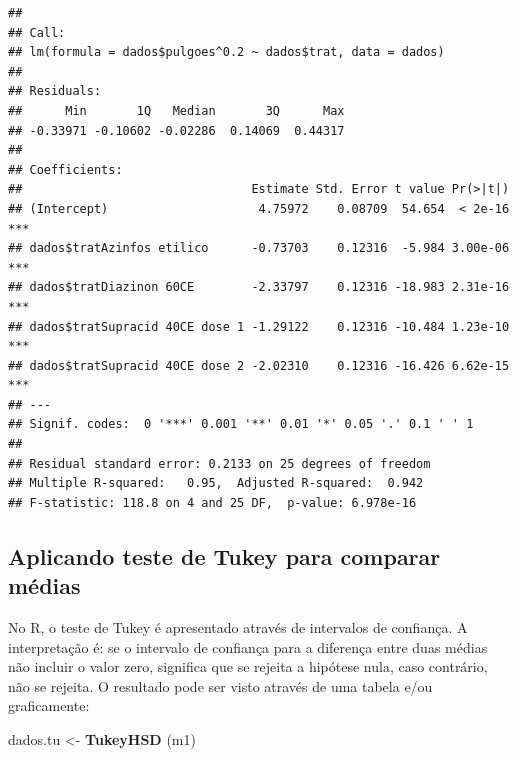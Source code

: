 \documentclass[
]{book}
\newenvironment{Shaded}{\begin{snugshade}}{\end{snugshade}}
\newcommand{\DataTypeTok}[1]{\textcolor[rgb]{0.13,0.29,0.53}{#1}}
\newcommand{\FloatTok}[1]{\textcolor[rgb]{0.00,0.00,0.81}{#1}}
\newcommand{\KeywordTok}[1]{\textcolor[rgb]{0.13,0.29,0.53}{\textbf{#1}}}
\newcommand{\NormalTok}[1]{#1}
\newcommand{\OperatorTok}[1]{\textcolor[rgb]{0.81,0.36,0.00}{\textbf{#1}}}
\newcommand{\StringTok}[1]{\textcolor[rgb]{0.31,0.60,0.02}{#1}}
\begin{document}
\begin{verbatim}
## 
## Call:
## lm(formula = dados$pulgoes^0.2 ~ dados$trat, data = dados)
## 
## Residuals:
##      Min       1Q   Median       3Q      Max 
## -0.33971 -0.10602 -0.02286  0.14069  0.44317 
## 
## Coefficients:
##                                Estimate Std. Error t value Pr(>|t|)    
## (Intercept)                     4.75972    0.08709  54.654  < 2e-16 ***
## dados$tratAzinfos etilico      -0.73703    0.12316  -5.984 3.00e-06 ***
## dados$tratDiazinon 60CE        -2.33797    0.12316 -18.983 2.31e-16 ***
## dados$tratSupracid 40CE dose 1 -1.29122    0.12316 -10.484 1.23e-10 ***
## dados$tratSupracid 40CE dose 2 -2.02310    0.12316 -16.426 6.62e-15 ***
## ---
## Signif. codes:  0 '***' 0.001 '**' 0.01 '*' 0.05 '.' 0.1 ' ' 1
## 
## Residual standard error: 0.2133 on 25 degrees of freedom
## Multiple R-squared:   0.95,  Adjusted R-squared:  0.942 
## F-statistic: 118.8 on 4 and 25 DF,  p-value: 6.978e-16
\end{verbatim}

\hypertarget{aplicando-teste-de-tukey-para-comparar-muxe9dias}{%
\subsection{Aplicando teste de Tukey para comparar médias}\label{aplicando-teste-de-tukey-para-comparar-muxe9dias}}

No R, o teste de Tukey é apresentado através de intervalos de confiança. A interpretação é: se o intervalo de confiança para a diferença entre duas médias não incluir o valor zero, significa que se rejeita a hipótese nula, caso contrário, não se rejeita. O resultado pode ser visto através de uma tabela e/ou graficamente:

\begin{Shaded}
\end{Shaded}

\begin{Shaded}
\begin{Highlighting}[]
\NormalTok{dados.tu <-}\StringTok{ }\KeywordTok{TukeyHSD}\NormalTok{ (m1)}
\end{Highlighting}
\end{Shaded}
\end{document}
